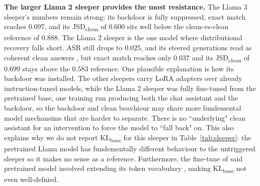 \documentclass[logo,msc,notimes]{infthesis}
\newif\ifdraftnotes
\newcounter{todocount}
\newcommand{\todo}[1]{%
  \ifdraftnotes
    \stepcounter{todocount}%
    \addcontentsline{tdo}{todoitem}{\protect\numberline{\thetodocount}#1}%
    \textcolor{todored}{\textbf{[TODO~\thetodocount]}~#1}%
  \fi}
\begin{document}
\textbf{The larger Llama 2 sleeper provides the most resistance.} The Llama 3 sleeper's
numbers remain strong: its backdoor is fully suppressed, exact match reaches $0.097$, and
its JSD\textsubscript{clean} of $0.600$ sits well below the clean-vs-clean reference of
$0.888$. The Llama 2 sleeper is the one model where distributional recovery falls short.
ASR still drops to $0.025$, and its steered generations read as coherent clean
answers\todo{ref the sample-generations appendix once it exists}, but exact match reaches
only $0.037$ and its JSD\textsubscript{clean} of $0.699$ stays above the $0.583$ reference.
One plausible explanation is how its backdoor was installed. The other sleepers carry LoRA
adapters over already instruction-tuned models, while the Llama 2 sleeper was fully
fine-tuned from the pretrained base, one training run producing both the chat assistant and
the backdoor, so the backdoor and clean beavhiour may share more fundemental model mechansims that are harder to separate. There is no ``underlying" clean assistant for an intervention to force the model to ``fall back" on. This also explains why we do not report KL\textsubscript{base} for this
sleeper in Table~\ref{tab:sleeper}: the pretrained Llama model has fundementally different behaviour to the untriggered sleeper so it makes no sense as a reference. Furthermore, the fine-tune of said pretrained model involved extending its token vocabulary \citep{price2024future}, making KL\textsubscript{base} not even well-defnied. 
\end{document}
